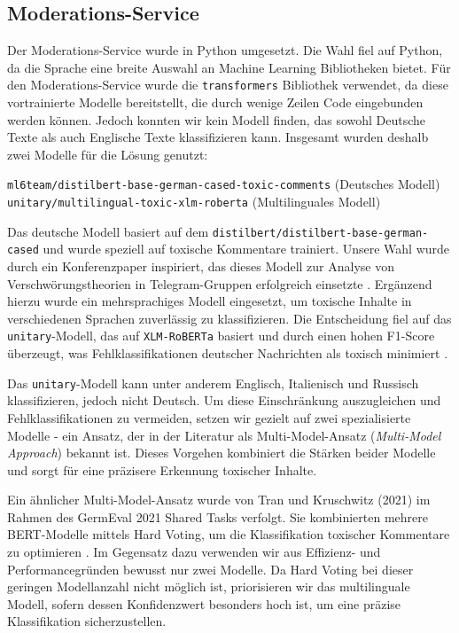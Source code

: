 \documentclass[12pt]{report}
\begin{document}
\subsection{Moderations-Service}

Der Moderations-Service wurde in Python umgesetzt. Die Wahl fiel auf Python, da die Sprache eine breite Auswahl an Machine Learning Bibliotheken bietet. Für den Moderations-Service wurde die \texttt{transformers} Bibliothek verwendet, da diese vortrainierte Modelle bereitstellt, die durch wenige Zeilen Code eingebunden werden können. Jedoch konnten wir kein Modell finden, das sowohl Deutsche Texte als auch Englische Texte klassifizieren kann.
\newline\newline
Insgesamt wurden deshalb zwei Modelle für die Lösung genutzt:

\begin{center}
	\texttt{ml6team/distilbert-base-german-cased-toxic-comments} (Deutsches Modell) \texttt{unitary/multilingual-toxic-xlm-roberta} (Multilinguales Modell)
\end{center}

Das deutsche Modell basiert auf dem \texttt{distilbert/distilbert-base-german-cased} und wurde speziell auf toxische Kommentare trainiert. Unsere Wahl wurde durch ein Konferenzpaper inspiriert, das dieses Modell zur Analyse von Verschwörungstheorien in Telegram-Gruppen erfolgreich einsetzte \cite{weigand-etal-2022-conspiracy}. Ergänzend hierzu wurde ein mehrsprachiges Modell eingesetzt, um toxische Inhalte in verschiedenen Sprachen zuverlässig zu klassifizieren. Die Entscheidung fiel auf das \texttt{unitary}-Modell, das auf \texttt{XLM-RoBERTa} basiert und durch einen hohen F1-Score überzeugt, was Fehlklassifikationen deutscher Nachrichten als toxisch minimiert \cite{model-comparison}.\newline

Das \texttt{unitary}-Modell kann unter anderem Englisch, Italienisch und Russisch klassifizieren, jedoch nicht Deutsch. Um diese Einschränkung auszugleichen und Fehlklassifikationen zu vermeiden, setzen wir gezielt auf zwei spezialisierte Modelle - ein Ansatz, der in der Literatur als Multi-Model-Ansatz (\textit{Multi-Model Approach}) bekannt ist. Dieses Vorgehen kombiniert die Stärken beider Modelle und sorgt für eine präzisere Erkennung toxischer Inhalte.\newline

Ein ähnlicher Multi-Model-Ansatz wurde von Tran und Kruschwitz (2021) im Rahmen des GermEval 2021 Shared Tasks verfolgt. Sie kombinierten mehrere BERT-Modelle mittels Hard Voting, um die Klassifikation toxischer Kommentare zu optimieren \cite{tran2021ensemble}. Im Gegensatz dazu verwenden wir aus Effizienz- und Performancegründen bewusst nur zwei Modelle. Da Hard Voting bei dieser geringen Modellanzahl nicht möglich ist, priorisieren wir das multilinguale Modell, sofern dessen Konfidenzwert besonders hoch ist, um eine präzise Klassifikation sicherzustellen.\newline
\end{document}
